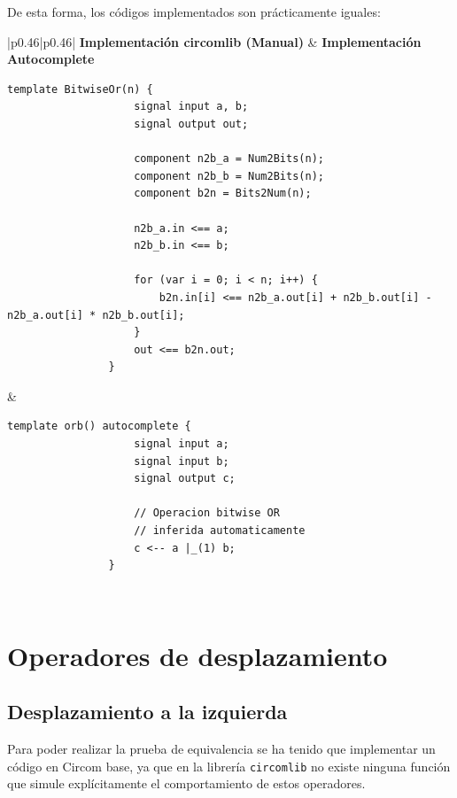 \documentclass[a4paper,12pt]{report}
\begin{document}
	\vspace{0.2cm}
	\noindent De esta forma, los códigos implementados son prácticamente iguales:
	
	\begin{table}[h!]
		\caption{Comparativa de la operación OR bit a bit (1 bit) entre la implementación estándar y el uso de autocomplete.}
		\label{tab:comparativa-orb}
		
		\centering
		\small %
		\begin{tabular}{|p{}|p{}|}
			\hline
			\centering \textbf{Implementación circomlib (Manual)} & \centering \textbf{Implementación Autocomplete} \cr \hline
			\begin{lstlisting}[language=Circom, basicstyle=\tiny\ttfamily, numbers=none, frame=none, xleftmargin=0pt]
				template BitwiseOr(n) {
					signal input a, b;
					signal output out;
					
					component n2b_a = Num2Bits(n);
					component n2b_b = Num2Bits(n);
					component b2n = Bits2Num(n);
					
					n2b_a.in <== a;
					n2b_b.in <== b;
					
					for (var i = 0; i < n; i++) {
						b2n.in[i] <== n2b_a.out[i] + n2b_b.out[i] - n2b_a.out[i] * n2b_b.out[i];
					}
					out <== b2n.out;
				}
			\end{lstlisting} 
			& 
			\begin{lstlisting}[language=Circom, basicstyle=\tiny\ttfamily, numbers=none, frame=none, xleftmargin=0pt]
				template orb() autocomplete {
					signal input a;
					signal input b;
					signal output c;
					
					// Operacion bitwise OR 
					// inferida automaticamente
					c <-- a |_(1) b;
				}
			\end{lstlisting} \\ \hline
		\end{tabular}
		
	\end{table}
	
	\section{Operadores de desplazamiento}
	\subsection{Desplazamiento a la izquierda}
	\label{sec:ver-despizq}
	\vspace{0.2cm}
	\noindent Para poder realizar la prueba de equivalencia se ha tenido que implementar un código en Circom base, ya que en la librería \texttt{circomlib} no existe ninguna función que simule explícitamente el comportamiento de estos operadores.
	
\end{document}
